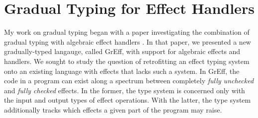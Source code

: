 \documentclass{article}
\theoremstyle{definition}
\theoremstyle{remark}
\begin{document}



\section{Gradual Typing for Effect Handlers}

My work on gradual typing began with a paper investigating the combination of
gradual typing with algebraic effect handlers \cite{new-giovannini-licata-2022}.
%
In that paper, we presented a new gradually-typed langauge, called GrEff, with
support for algebraic effects and handlers. We sought to study the question of
retrofitting an effect typing system onto an existing language with effects that
lacks such a system. In GrEff, the code in a program can exist along a spectrum
between completely \emph{fully unchecked} and \emph{fully checked} effects. In
the former, the type system is concerned only with the input and output types of
effect operations. With the latter, the type system additionally tracks which
effects a given part of the program may raise.
\end{document}
